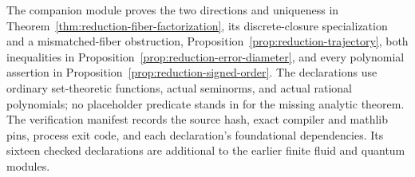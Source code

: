 The companion module proves the two directions and uniqueness in
Theorem~\ref{thm:reduction-fiber-factorization}, its discrete-closure
specialization and a mismatched-fiber obstruction,
Proposition~\ref{prop:reduction-trajectory}, both inequalities in
Proposition~\ref{prop:reduction-error-diameter}, and every polynomial
assertion in Proposition~\ref{prop:reduction-signed-order}.
The declarations use ordinary set-theoretic functions, actual seminorms,
and actual rational polynomials; no placeholder predicate stands in for
the missing analytic theorem. The verification manifest records the source
hash, exact compiler and mathlib pins, process exit code, and each
declaration's foundational dependencies. Its sixteen checked declarations
are additional to the earlier finite fluid and quantum modules.
